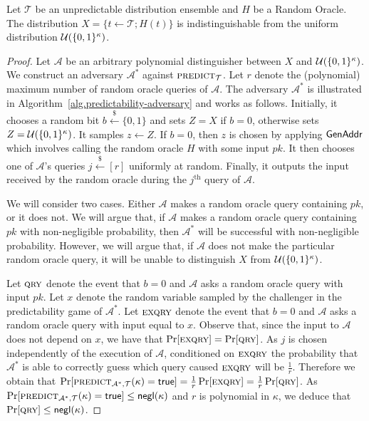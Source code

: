 \begin{lemma}\label{lem:ro-unpredictability}
  Let $\mathcal{T}$ be an unpredictable distribution ensemble and $H$ be a
  Random Oracle.
  The distribution $X = \{t \gets \mathcal{T}; H(t)\}$ is indistinguishable from
  the uniform distribution $\mathcal{U}(\{0,1\}^\kappa)$.
\end{lemma}
\begin{proof}
  Let $\mathcal{A}$ be an arbitrary polynomial distinguisher between
  $X$ and $\mathcal{U}(\{0, 1\}^\kappa)$.
  We construct an adversary $\mathcal{A}^*$
  against $\textsc{predict}_{\mathcal{T}}$.
  Let $r$ denote the (polynomial)
  maximum number of random oracle queries of $\mathcal{A}$.
  The adversary $\mathcal{A}^*$ is illustrated in
  Algorithm~\ref{alg.predictability-adversary} and works as follows.
  Initially, it chooses a random bit $b \stackrel{\$}{\gets} \{0, 1\}$ and
  sets $Z = X$ if $b = 0$, otherwise
  sets $Z = \mathcal{U}(\{0,1\}^\kappa)$.
  It samples $z \gets Z$.
  If $b = 0$, then $z$ is chosen by applying $\mathsf{GenAddr}$ which involves
  calling the random oracle $H$ with some input $pk$.
  It then chooses one of $\mathcal{A}$'s queries $j \stackrel{\$}{\gets} [r]$
  uniformly at random. Finally, it outputs the input received by the random
  oracle during the $j^\text{th}$ query of $\mathcal{A}$.

  We will consider two cases. Either $\mathcal{A}$ makes a random oracle query
  containing $pk$, or it does not. We will argue that, if $\mathcal{A}$ makes
  a random oracle query containing $pk$ with non-negligible probability, then
  $\mathcal{A}^*$ will be successful with non-negligible probability. However,
  we will argue that, if $\mathcal{A}$ does not make the particular random
  oracle query, it will be unable to distinguish $X$ from $\mathcal{U}(\{0,1\}^\kappa)$.

  Let $\textsc{qry}$ denote the event that $b = 0$ and $\mathcal{A}$ asks a random
  oracle query with input $pk$.
  Let $x$ denote the random variable sampled by the challenger in the
  predictability game of $\mathcal{A}^*$.
  Let $\textsc{exqry}$ denote the event that $b = 0$ and $\mathcal{A}$ asks a
  random oracle query with input equal to $x$. Observe that, since the input to
  $\mathcal{A}$ does not depend on $x$, we have that
  $\Pr[\textsc{exqry}] = \Pr[\textsc{qry}]$. As $j$ is chosen independently of the execution
  of $\mathcal{A}$, conditioned on $\textsc{exqry}$ the probability that
  $\mathcal{A}^*$ is able to correctly guess which query caused $\textsc{exqry}$ will
  be $\frac{1}{r}$. Therefore we obtain that
  $\Pr[\textsc{predict}_{\mathcal{A}^*,\mathcal{T}}(\kappa) = \mathsf{true}]
   = \frac{1}{r}\Pr[\textsc{exqry}]
   = \frac{1}{r}\Pr[\textsc{qry}]$.
  As
  $\Pr[\textsc{predict}_{\mathcal{A}^*,\mathcal{T}}(\kappa) = \mathsf{true}] \leq \textsf{negl}(\kappa)$
  and $r$
  is polynomial in $\kappa$, we deduce that $\Pr[\textsc{qry}] \leq \textsf{negl}(\kappa)$.


\end{proof}

